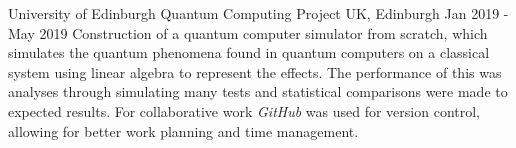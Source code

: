     \cventry
        {University of Edinburgh}
        {Quantum Computing Project}
        {UK, Edinburgh}
        {Jan 2019 - May 2019}
        {
         Construction of a quantum computer simulator from scratch, which 
         simulates the quantum phenomena found in quantum computers on a 
         classical system using linear algebra to represent the effects. The 
         performance of this was analyses through simulating many tests and 
         statistical comparisons were made to expected results. For 
         collaborative work \textit{GitHub} was used for version control, 
         allowing for better work planning and time management.\newline
        }
        
